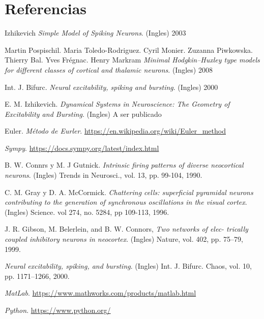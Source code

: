 \documentclass[12pt]{article}
\begin{document}
\newpage

\section{Referencias}

\begin{thebibliography}{9}

Izhikevich
\textit{Simple Model of Spiking Neurons}. (Ingles) 2003

Martin Pospischil. Maria Toledo-Rodriguez. Cyril Monier. Zuzanna Piwkowska. Thierry Bal. Yves Frégnac. Henry Markram
\textit{Minimal Hodgkin–Huxley type models for different classes of cortical and thalamic neurons}. (Ingles) 2008

Int. J. Bifurc.
\textit{Neural excitability, spiking and bursting}. (Ingles) 2000

E. M. Izhikevich.
\textit{Dynamical Systems in Neuroscience: The Geometry of Excitability and Bursting}. (Ingles) A ser publicado

Euler.
\textit{Método de Eurler}. \url{https://en.wikipedia.org/wiki/Euler_method}

\textit{Sympy}. \url{https://docs.sympy.org/latest/index.html}

B. W. Connrs y M. J Gutnick.
\textit{Intrinsic firing patterns of diverse neocortical neurons}. (Ingles) Trends in Neurosci., vol. 13, pp. 99-104, 1990.

C. M. Gray y D. A. McCormick.
\textit{Chattering cells: superficial pyramidal neurons contributing to the generation of synchronous oscillations in the visual cortex}. (Ingles) Science. vol 274, no. 5284, pp 109-113, 1996.

J. R. Gibson, M. Belerlein, and B. W. Connors,
\textit{Two networks of elec- trically coupled inhibitory neurons in neocortex}. (Ingles) Nature, vol. 402, pp. 75–79, 1999.

\textit{Neural excitability, spiking, and bursting}. (Ingles) Int. J. Bifurc. Chaos, vol. 10, pp. 1171–1266, 2000.

\textit{MatLab}. \url{https://www.mathworks.com/products/matlab.html}

\textit{Python}. \url{https://www.python.org/}

\end{thebibliography}
\end{document}

